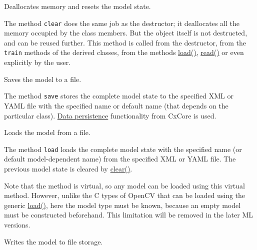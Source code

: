 
Deallocates memory and resets the model state.


The method \texttt{clear} does the same job as the destructor; it deallocates all the memory occupied by the class members. But the object itself is not destructed, and can be reused further. This method is called from the destructor, from the \texttt{train} methods of the derived classes, from the methods \href{#CvStatModel.3A.3Aload}{load()}, \href{#CvStatModel.3A.3Aread}{read()} or even explicitly by the user.



Saves the model to a file.


The method \texttt{save} stores the complete model state to the specified XML or YAML file with the specified name or default name (that depends on the particular class). \href{opencvref_cxcore.htm#cxcore_persistence}{Data persistence} functionality from CxCore is used.



Loads the model from a file.


The method \texttt{load} loads the complete model state with the specified name (or default model-dependent name) from the specified XML or YAML file. The previous model state is cleared by \href{#CvStatModel.3A.3Aclear}{clear()}.

Note that the method is virtual, so any model can be loaded using this virtual method. However, unlike the C types of OpenCV that can be loaded using the generic \href{opencvref_cxcore.htm#decl_cvLoad}{load()}, here the model type must be known, because an empty model must be constructed beforehand. This limitation will be removed in the later ML versions.



Writes the model to file storage.

